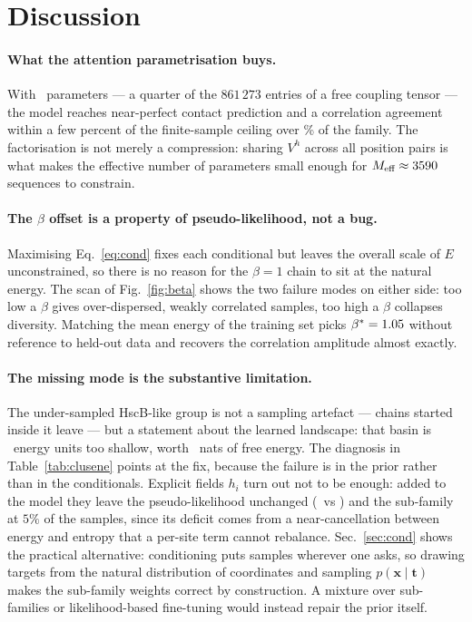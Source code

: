 \documentclass[10pt,twocolumn,a4paper]{article}
\begin{document}


\section{Discussion}
\paragraph{What the attention parametrisation buys.} With \Nparams\ parameters --- a quarter of
the $861\,273$ entries of a free coupling tensor --- the model reaches near-perfect contact
prediction and a correlation agreement within a few percent of the finite-sample ceiling over
\CovWeight\% of the family. The factorisation is not merely a compression: sharing $V^h$ across
all position pairs is what makes the effective number of parameters small enough for
$M_\text{eff}\approx3590$ sequences to constrain.

\paragraph{The $\beta$ offset is a property of pseudo-likelihood, not a bug.} Maximising
Eq.~\eqref{eq:cond} fixes each conditional but leaves the overall scale of $E$ unconstrained, so
there is no reason for the $\beta=1$ chain to sit at the natural energy. The scan of
Fig.~\ref{fig:beta} shows the two failure modes on either side: too low a $\beta$ gives
over-dispersed, weakly correlated samples, too high a $\beta$ collapses diversity. Matching the
mean energy of the training set picks $\beta^*=1.05$ without reference to held-out data and
recovers the correlation amplitude almost exactly.

\paragraph{The missing mode is the substantive limitation.} The under-sampled HscB-like group is
not a sampling artefact --- chains started inside it leave --- but a statement about the learned
landscape: that basin is \EgapMiss\ energy units too shallow, worth \dFmiss\ nats of free energy.
The diagnosis in Table~\ref{tab:clusene} points at the fix, because the failure is in the prior
rather than in the conditionals. Explicit fields $h_i$ turn out not to be enough: added to the model
they leave the pseudo-likelihood unchanged (\ValBase\ vs \ValMtwo) and the sub-family at $5\%$ of the
samples, since its deficit comes from a near-cancellation between energy and entropy that a per-site
term cannot rebalance. Sec.~\ref{sec:cond} shows the practical alternative: conditioning puts
samples wherever one asks, so drawing targets from the natural distribution of coordinates and
sampling $p(\bm x\mid\bm t)$ makes the sub-family weights correct by construction. A mixture over
sub-families or likelihood-based fine-tuning would instead repair the prior itself.
\end{document}

